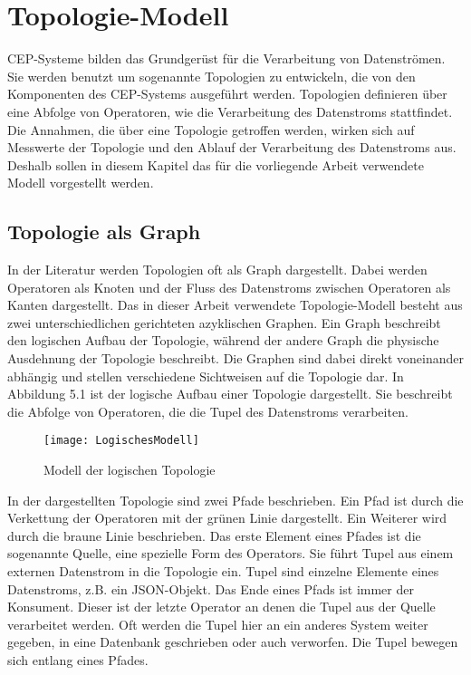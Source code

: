 \chapter{Topologie-Modell}

CEP-Systeme bilden das Grundgerüst für die Verarbeitung von Datenströmen.
Sie werden benutzt um sogenannte Topologien zu entwickeln, die von den Komponenten des CEP-Systems ausgeführt werden.
Topologien definieren über eine Abfolge von Operatoren, wie die Verarbeitung des Datenstroms stattfindet.
Die Annahmen, die über eine Topologie getroffen werden, wirken sich auf Messwerte der Topologie und den Ablauf der Verarbeitung des Datenstroms aus.
Deshalb sollen in diesem Kapitel das für die vorliegende Arbeit verwendete Modell vorgestellt werden.

\section{Topologie als Graph}

In der Literatur werden Topologien oft als Graph dargestellt.
Dabei werden Operatoren als Knoten und der Fluss des Datenstroms zwischen Operatoren als Kanten dargestellt.
Das in dieser Arbeit verwendete Topologie-Modell besteht aus zwei unterschiedlichen gerichteten azyklischen Graphen.
Ein Graph beschreibt den logischen Aufbau der Topologie, während der andere Graph die physische Ausdehnung der Topologie beschreibt.
Die Graphen sind dabei direkt voneinander abhängig und stellen verschiedene Sichtweisen auf die Topologie dar.
In Abbildung 5.1 ist der logische Aufbau einer Topologie dargestellt. 
Sie beschreibt die Abfolge von Operatoren, die die Tupel des Datenstroms verarbeiten.

\begin{figure}
\texttt{[image: LogischesModell]}
\caption{Modell der logischen Topologie}
\end{figure}

In der dargestellten Topologie sind zwei Pfade beschrieben.
Ein Pfad ist durch die Verkettung der Operatoren mit der grünen Linie dargestellt.
Ein Weiterer wird durch die braune Linie beschrieben.
Das erste Element eines Pfades ist die sogenannte Quelle, eine spezielle Form des Operators.
Sie führt Tupel aus einem externen Datenstrom in die Topologie ein.
Tupel sind einzelne Elemente eines Datenstroms, z.B. ein JSON-Objekt.
Das Ende eines Pfads ist immer der Konsument.
Dieser ist der letzte Operator an denen die Tupel aus der Quelle verarbeitet werden. 
Oft werden die Tupel hier an ein anderes System weiter gegeben, in eine Datenbank geschrieben oder auch verworfen.
Die Tupel bewegen sich entlang eines Pfades.

